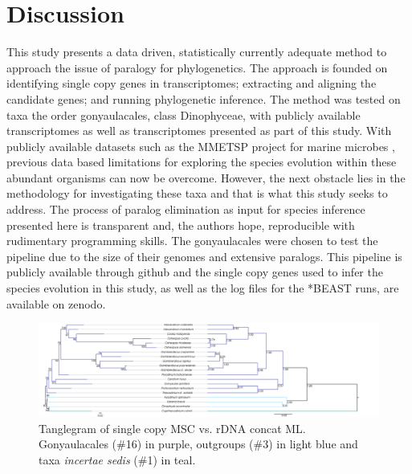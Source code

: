 \documentclass[12pt]{article}
\begin{document}
\newpage
\section{Discussion}

This study presents a data driven, statistically currently adequate method to approach the issue of paralogy for phylogenetics. 
The approach is founded on identifying single copy genes in transcriptomes; extracting and aligning the candidate genes; and running phylogenetic inference. 
The method was tested on taxa the order gonyaulacales, class Dinophyceae, with publicly available transcriptomes as well as transcriptomes presented as part of this study. 
With publicly available datasets such as the MMETSP project for marine microbes \cite{keeling2014marine}, previous data based limitations for exploring the species evolution within these abundant organisms can now be overcome. 
However, the next obstacle lies in the methodology for investigating these taxa and that is what this study seeks to address. 
The process of paralog elimination as input for species inference presented here is transparent and, the authors hope, reproducible with rudimentary programming skills. 
The gonyaulacales were chosen to test the pipeline due to the size of their genomes and extensive paralogs.
This pipeline is publicly available through github and the single copy genes used to infer the species evolution in this study, as well as the log files for the *BEAST runs, are available on zenodo.

\FloatBarrier 
\begin{figure} 
\includegraphics[scale=.23]{figures/MSC-BI_vs_rDNA-ML.png} 
\caption{Tanglegram of single copy MSC vs. rDNA concat ML. Gonyaulacales (\#16) in purple, outgroups (\#3) in light blue and taxa \textit{incertae sedis} (\#1) in teal.} 
\label{fig:tanglerDNA}
\end{figure} 
\FloatBarrier
\end{document}
